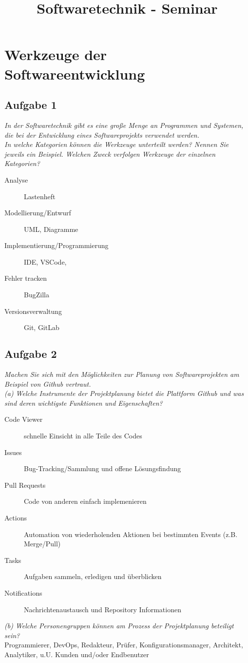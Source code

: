 \documentclass{article}
\title{Softwaretechnik - Seminar}
\begin{document}
\section{Werkzeuge der Softwareentwicklung}
\subsection{Aufgabe 1}
\textit{In der Softwaretechnik gibt es eine große Menge an Programmen und Systemen, die bei der Entwicklung eines Softwareprojekts verwendet werden.}\\
\textit{In welche Kategorien können die Werkzeuge unterteilt werden? Nennen Sie jeweils ein Beispiel. Welchen Zweck verfolgen Werkzeuge der einzelnen Kategorien?}\\
\begin{description}
    \item[Analyse] Lastenheft
    \item[Modellierung/Entwurf] UML, Diagramme
    \item[Implementierung/Programmierung] IDE, VSCode, 
    \item[Fehler tracken] BugZilla
    \item[Versionsverwaltung] Git, GitLab    
\end{description}

\subsection{Aufgabe 2}
\textit{Machen Sie sich mit den Möglichkeiten zur Planung von Softwareprojekten am Beispiel von Github vertraut.}\\
\textit{(a) Welche Instrumente der Projektplanung bietet die Plattform Github und was sind deren wichtigste Funktionen und Eigenschaften?}\\
\begin{description}
    \item[Code Viewer] schnelle Einsicht in alle Teile des Codes
    \item[Issues] Bug-Tracking/Sammlung und offene Lösungsfindung
    \item[Pull Requests] Code von anderen einfach implemenieren 
    \item[Actions] Automation von wiederholenden Aktionen bei bestimmten Events (z.B. Merge/Pull)
    \item[Tasks] Aufgaben sammeln, erledigen und überblicken 
    \item[Notifications] Nachrichtenaustausch und Repository Informationen
\end{description}
\noindent\textit{(b) Welche Personengruppen können am Prozess der Projektplanung beteiligt sein?}\\
Programmierer, DevOps, Redakteur, Prüfer, Konfigurationsmanager, Architekt, Analytiker, u.U. Kunden und/oder Endbenutzer
\end{document}
